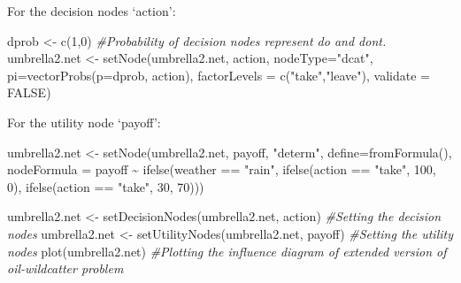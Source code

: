 \documentclass[
]{article}
\newenvironment{Shaded}{\begin{snugshade}}{\end{snugshade}}
\newcommand{\AttributeTok}[1]{\textcolor[rgb]{0.77,0.63,0.00}{#1}}
\newcommand{\CommentTok}[1]{\textcolor[rgb]{0.56,0.35,0.01}{\textit{#1}}}
\newcommand{\ConstantTok}[1]{\textcolor[rgb]{0.00,0.00,0.00}{#1}}
\newcommand{\DecValTok}[1]{\textcolor[rgb]{0.00,0.00,0.81}{#1}}
\newcommand{\FunctionTok}[1]{\textcolor[rgb]{0.00,0.00,0.00}{#1}}
\newcommand{\NormalTok}[1]{#1}
\newcommand{\OtherTok}[1]{\textcolor[rgb]{0.56,0.35,0.01}{#1}}
\newcommand{\SpecialCharTok}[1]{\textcolor[rgb]{0.00,0.00,0.00}{#1}}
\newcommand{\StringTok}[1]{\textcolor[rgb]{0.31,0.60,0.02}{#1}}
\begin{document}
For the decision nodes `action':

\begin{Shaded}
\begin{Highlighting}[]
\NormalTok{dprob }\OtherTok{\textless{}{-}} \FunctionTok{c}\NormalTok{(}\DecValTok{1}\NormalTok{,}\DecValTok{0}\NormalTok{) }\CommentTok{\#Probability of decision nodes represent do and don\textquotesingle{}t.}
\NormalTok{umbrella2.net }\OtherTok{\textless{}{-}} \FunctionTok{setNode}\NormalTok{(umbrella2.net, action, }\AttributeTok{nodeType=}\StringTok{"dcat"}\NormalTok{, }\AttributeTok{pi=}\FunctionTok{vectorProbs}\NormalTok{(}\AttributeTok{p=}\NormalTok{dprob, action), }\AttributeTok{factorLevels =} \FunctionTok{c}\NormalTok{(}\StringTok{"take"}\NormalTok{,}\StringTok{"leave"}\NormalTok{), }\AttributeTok{validate =} \ConstantTok{FALSE}\NormalTok{)}
\end{Highlighting}
\end{Shaded}

For the utility node `payoff':

\begin{Shaded}
\begin{Highlighting}[]
\NormalTok{umbrella2.net }\OtherTok{\textless{}{-}} \FunctionTok{setNode}\NormalTok{(umbrella2.net, payoff, }\StringTok{"determ"}\NormalTok{, }\AttributeTok{define=}\FunctionTok{fromFormula}\NormalTok{(),}
                  \AttributeTok{nodeFormula =}\NormalTok{ payoff }\SpecialCharTok{\textasciitilde{}} \FunctionTok{ifelse}\NormalTok{(weather }\SpecialCharTok{==} \StringTok{"rain"}\NormalTok{,}
                                                      \FunctionTok{ifelse}\NormalTok{(action }\SpecialCharTok{==} \StringTok{"take"}\NormalTok{, }\DecValTok{100}\NormalTok{, }\DecValTok{0}\NormalTok{),}
                                                             \FunctionTok{ifelse}\NormalTok{(action }\SpecialCharTok{==} \StringTok{"take"}\NormalTok{, }\DecValTok{30}\NormalTok{, }\DecValTok{70}\NormalTok{)))}

\NormalTok{umbrella2.net }\OtherTok{\textless{}{-}} \FunctionTok{setDecisionNodes}\NormalTok{(umbrella2.net, action) }\CommentTok{\#Setting the decision nodes}
\NormalTok{umbrella2.net }\OtherTok{\textless{}{-}} \FunctionTok{setUtilityNodes}\NormalTok{(umbrella2.net, payoff) }\CommentTok{\#Setting the utility nodes}
\FunctionTok{plot}\NormalTok{(umbrella2.net) }\CommentTok{\#Plotting the influence diagram of extended version of oil{-}wildcatter problem}
\end{Highlighting}
\end{Shaded}
\end{document}
